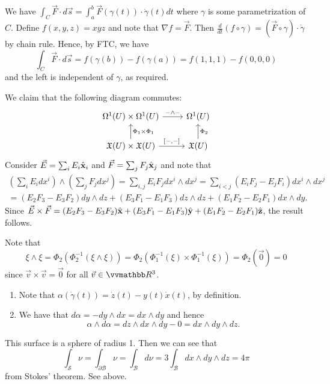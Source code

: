 \documentclass[11pt,letterpaper]{article}
\begin{document}
We have $\int_C \Vec{F} \cdot d\Vec{s}= \int_a^b \Vec{F}(\gamma(t))\cdot \Dot{\gamma}(t) dt$ where $\gamma$ is some parametrization of $C$. Define $f(x,y,z)=xyz$ and note that $\nabla f= \Vec{F}$. Then $\frac{d}{dt} (f\circ \gamma)= (\Vec{F} \circ \gamma)\cdot \Dot{\gamma}$ by chain rule. Hence, by FTC, we have
    \[\int_C \Vec{F} \cdot d\Vec{s} = f(\gamma(b))-f(\gamma(a))=f(1,1,1)-f(0,0,0)\]
and the left is independent of $\gamma$, as required.


We claim that the following diagram commutes:
\[\begin{tikzcd}[ampersand replacement=\&]
	{\Omega^1(U)\times \Omega^1(U)} \& {\Omega^1(U)} \\
	{\mathfrak{X}(U)\times \mathfrak{X}(U)} \& {\mathfrak{X}(U)}
	\arrow["{-\wedge-}", from=1-1, to=1-2]
	\arrow["{\Phi_1\times \Phi_1}"', from=2-1, to=1-1]
	\arrow["{[-,-]}", from=2-1, to=2-2]
	\arrow["{\Phi_2}"', from=2-2, to=1-2]
\end{tikzcd}\]
Consider $\Vec{E} = \sum_i E_i \Hat{\textbf{x}}_i$ and $\Vec{F}= \sum_j F_j \Hat{\textbf{x}}_j$ and note that
    \begin{multline*}
        \left(\sum_{i} E_i dx^i\right) \wedge \left(\sum_{j} F_j dx^j\right)=\sum_{i,j} E_i F_j dx^i \wedge dx^j= \sum_{i<j} (E_i F_j - E_j F_i )dx^i \wedge dx^j\\ =(E_2 F_3-E_3 F_2)dy \wedge dz + (E_3 F_1 - E_1 F_3) dz\wedge dz + (E_1 F_2 - E_2 F_1) dx\wedge dy.
    \end{multline*}
Since $\Vec{E}\times \Vec{F} = (E_2 F_3 - E_3 F_2)\Hat{\textbf{x}}+ (E_3 F_1 - E_1 F_3) \Hat{\textbf{y}} + (E_1 F_2 - E_2 F_1) \Hat{\textbf{z}}$, the result follows.

Note that \[\xi \wedge \xi =\Phi_2( \Phi_2^{-1}(\xi \wedge \xi )) = \Phi_2(\Phi_1^{-1}(\xi)\times \Phi_1^{-1}(\xi))=\Phi_2(\Vec{0})=0\]
since $\Vec{v}\times \Vec{v}=\Vec{0}$ for all $\Vec{v}\in \R^3$.

\begin{enumerate}[label=(\alph*)]
    \item Note that $\alpha(\Dot{\gamma}(t))=\Dot{z}(t)-y(t) \Dot{x}(t)$, by definition.
    \item We have that $d\alpha= - dy\wedge dx = dx\wedge dy$ and hence
        \[\alpha\wedge d\alpha = dz\wedge dx 
        \wedge dy - 0 = dx\wedge dy \wedge dz.\]
\end{enumerate}

This surface is a sphere of radius 1. Then we can see that
    \[\int_{\mathcal{S}}\nu = \int_{\partial \mathcal{B}}\nu=\int_{\mathcal{B}}d\nu=3\int_{\mathcal{B}}dx\wedge dy \wedge dz=4\pi\]
from Stokes' theorem.
See above.
\end{document}
